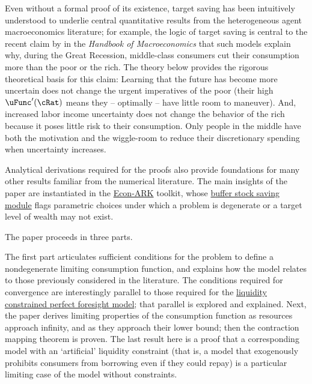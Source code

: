 \documentclass[BufferStockTheory]{subfiles}
\begin{document}
\hypertarget{KMP}{}

Even without a formal proof of its existence, target saving has been intuitively understood to underlie central quantitative results from the heterogeneous agent macroeconomics literature; for example, the logic of target saving is central to the recent claim by \cite{kmpHandbook} in the \textit{Handbook of Macroeconomics} that such models explain why, during the Great Recession, middle-class consumers cut their consumption more than the poor or the rich.  The theory below provides the rigorous theoretical basis for this claim:  Learning that the future has become more uncertain does not change the urgent imperatives of the poor (their high $\uFunc^{\prime}(\cRat)$ means they -- optimally -- have little room to maneuver).  And, increased labor income uncertainty does not change the behavior of the rich because it poses little risk to their consumption.  Only people in the middle have both the motivation and the wiggle-room to reduce their discretionary spending when uncertainty increases.

Analytical derivations required for the proofs also provide foundations for many other results familiar from the numerical literature.  The main insights of the paper are instantiated in the \href{https://econ-ark.org}{Econ-ARK} toolkit, whose \href{https://hark.readthedocs.io/en/stable/reference/ConsumptionSaving/ConsIndShockModel.html}{buffer stock saving module} flags parametric choices under which a problem is degenerate or a target level of wealth may not exist.%


The paper proceeds in three parts.

The first part articulates sufficient conditions for the problem to define a nondegenerate limiting consumption function, and explains how the model relates to those previously considered in the literature.  The conditions required for convergence are interestingly parallel to those required for the \hyperlink{Factors-Defined-And-Compared}{liquidity constrained perfect foresight model}; that parallel is explored and explained.  Next, the paper derives limiting properties of the consumption function as resources approach infinity, and as they approach their lower bound; then the contraction mapping theorem is proven.  The last result here is a proof that a corresponding model with an `artificial' liquidity constraint (that is, a model that exogenously prohibits consumers from borrowing even if they could repay) is a particular limiting case of the model without constraints.
  
\end{document}
